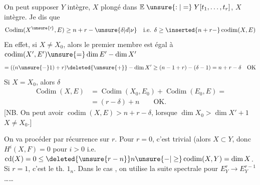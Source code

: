 On peut supposer $Y$ intègre,  $X$
plongé dans $\mathbb E\mathrel{\unsure{:|=}}Y[t_1,\ldots,t_r]$, $X$ intègre.
 Je dis que
\[
\operatorname{Codim}(X^{\unsure{\prime}},E)\geq n+r-\unsure{\delta|d|\nu}\quad\text{i.e. }\delta\geq\inserted{n+r-}\operatorname{codim}(X,E)
\]
En effet, si $X\ne X_0$, alors le premier membre est
égal à $\operatorname{codim}(X',E')\unsure{=}\dim E'-\dim X'$
\[
=((n\unsure{-}1)+r)\deleted{\unsure{+}}-\dim X'\geq(n-1+r)-(\delta-1)=n+r-\delta\quad\text{OK}
\]
Si $X=X_0$, alors $\delta$
\[
\begin{aligned}
\operatorname{Codim}(X,E)&=\operatorname{Codim}(X_0,E_0)+\operatorname{Codim}(E_0,E)=\\
&=(r-\delta)+n\qquad\text{OK.}
\end{aligned}
\]
[NB. On  peut avoir $\operatorname{codim}(X,E)>n+r-\delta$,
  lorsque $\dim X_0>\dim X'+1$  
 $X\ne X_0$.]

On va procéder par récurrence sur $r$.
Pour $r=0$, c'est trivial \deleted{(tt est [\unsure{str}} (alors $X\subset Y$, donc $H^i(X,F)=0$ pour $i>0$ i.e.
$\operatorname{cd}(X)=0\leq\deleted{\unsure{r-n}}n\unsure{-|\geq}\operatorname{codim}(X,Y)=\dim X$. Si
$r=1$, c'est le th. $1_n$. Dans le cas
,  on utilise la suite spectrale
pour $E_Y^r\longrightarrow E_Y^{r-1}$ \ldots\ldots
